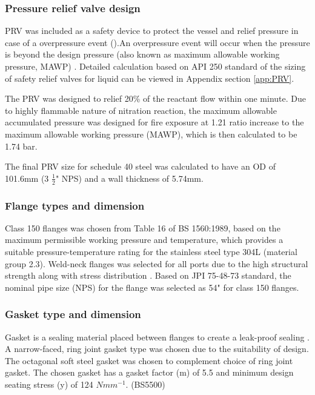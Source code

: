 \subsubsection{Pressure relief valve design}
PRV was included as a safety device to protect the vessel and relief pressure in case of a overpressure event ().An overpressure event will occur when the pressure is beyond the design pressure (also known as maximum allowable working pressure, MAWP) \cite{marsha_lecture_nodate}. Detailed calculation based on API 250 standard \cite{api_standard_520_sizing_2013} of the sizing of safety relief valves for liquid can be viewed in Appendix section \ref{app:PRV}.

The PRV was designed to relief 20\% of the reactant flow within one minute. Due to highly flammable nature of nitration reaction, the maximum allowable accumulated pressure was designed for fire exposure at 1.21 ratio increase to the maximum allowable working pressure (MAWP), which is then calculated to be 1.74 bar. 

The final PRV size for schedule 40 steel was calculated to have an OD of 101.6mm (3 $\frac{1}{2}$" NPS) and a wall thickness of 5.74mm.



\subsubsection{Flange types and dimension}
Class 150 flanges was chosen from Table 16 of BS 1560:1989, based on the maximum permissible working pressure and temperature, which provides a suitable pressure-temperature rating for the stainless steel type 304L (material group 2.3). Weld-neck flanges was selected for all ports due to the high structural strength along with stress distribution \cite{ulma_forge_welding_2020}.
Based on JPI 75-48-73 standard, the nominal pipe size (NPS) for the flange was selected as 54" for class 150 flanges.
\subsubsection{Gasket type and dimension}
Gasket is a sealing material placed between flanges to create a leak-proof sealing \cite{varun_piping_nodate}. A narrow-faced, ring joint gasket type was chosen due to the suitability of design. The octagonal soft steel gasket was chosen to complement choice of ring joint gasket. The chosen gasket has a gasket factor (m) of 5.5 and minimum design seating stress (y) of 124 $Nmm^{-1}$. (BS5500)

